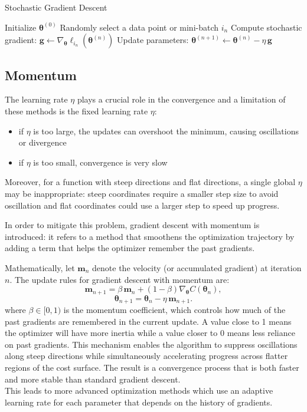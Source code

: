 \documentclass[
    article
 reprint,            %
 amsmath,amssymb,
 aps,
]{revtex4-2}
\begin{document}
\begin{algorithm}[H]
\caption{Stochastic Gradient Descent}
\begin{algorithmic}[1]
\State Initialize $\boldsymbol{\theta}^{(0)}$
    \State Randomly select a data point or mini-batch $i_n$
    \State Compute stochastic gradient: $\mathbf{g} \gets \nabla_{\boldsymbol{\theta}} \ell_{i_n}(\boldsymbol{\theta}^{(n)})$
    \State Update parameters: $\boldsymbol{\theta}^{(n+1)} \gets \boldsymbol{\theta}^{(n)} - \eta \, \mathbf{g}$
\EndFor
\end{algorithmic}
\end{algorithm}

\subsection{Momentum}

The learning rate $\eta$ plays a crucial role in the convergence and a limitation of these methods is the fixed learning rate ${\eta}$: 
\begin{itemize}
    \item if $\eta$ is too large, the updates can overshoot the minimum, causing oscillations or divergence
    \item if $\eta$ is too small, convergence is very slow
\end{itemize}
Moreover, for a function with steep directions and flat directions, a single global $ \eta$ may be inappropriate:
steep coordinates require a smaller step size to avoid oscillation and flat coordinates could use a larger step to speed up progress.

In order to mitigate this problem, gradient descent with momentum is introduced: it refers to a method that smoothens the optimization trajectory by adding a term that helps the optimizer remember the past gradients\cite{hjorthjensen_week37}.

Mathematically, let $\boldsymbol{m}_n$ denote the velocity (or accumulated gradient) at iteration $n$. The update rules for gradient descent with momentum are:
\[
\boldsymbol{m}_{n+1} = \beta \, \boldsymbol{m}_n + (1-\beta)\nabla_{\boldsymbol{\theta}} C(\boldsymbol{\theta}_n),
\]
\[
\boldsymbol{\theta}_{n+1} = \boldsymbol{\theta}_n - \eta \, \boldsymbol{m}_{n+1}.
\]
where $\beta \in [0,1)$ is the momentum coefficient, which controls how much of the past gradients are remembered in the current update. A value close to 1 means the optimizer will have more inertia while a value closer to 0 means less reliance on past gradients. This mechanism enables the algorithm to suppress oscillations along steep directions while simultaneously accelerating progress across flatter regions of the cost surface. The result is a convergence process that is both faster and more stable than standard gradient descent.\\
This leads to more advanced optimization methods which use an adaptive learning rate for each parameter that depends on the history of gradients.\cite{hjorthjensen_week37}\\
\end{document}
